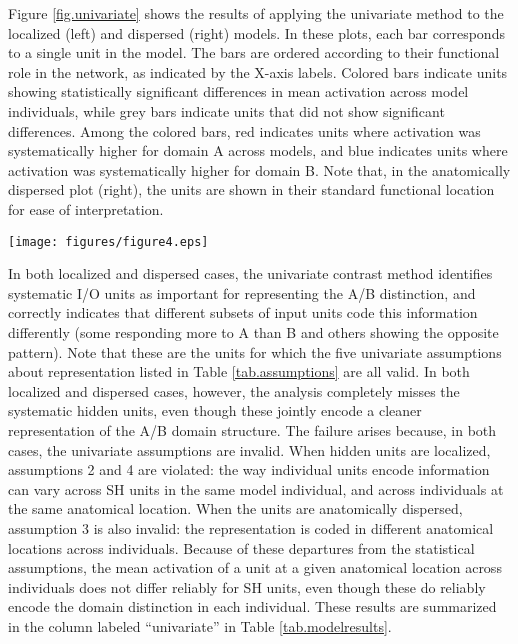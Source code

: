 Figure \ref{fig.univariate} shows the results of applying the univariate method to the localized (left) and dispersed (right) models. In these plots, each bar corresponds to a single unit in the model. The bars are ordered according to their functional role in the network, as indicated by the X-axis labels. Colored bars indicate units showing statistically significant differences in mean activation across model individuals, while grey bars indicate units that did not show significant differences. Among the colored bars, red indicates units where activation was systematically higher for domain A across models, and blue indicates units where activation was systematically higher for domain B. Note that, in the anatomically dispersed plot (right), the units are shown in their standard functional location for ease of interpretation.


\begin{figure*}
\centering
\texttt{[image: figures/figure4.eps]}
\caption{Results from the univariate analysis of simulated data. Bar height indicates the absolute value of the $t$ statistic for the unit-wise contrast between conditions at the group level. Colored bars indicate units showing significant differences with p-values corrected to control the false discovery rate at $q<0.05$. The red-blue scale indicates the direction of the contrast effect across model subjects, with red indicating units consistently showing greater activation for A items.}
\label{fig.univariate} 
\end{figure*}

In both localized and dispersed cases, the univariate contrast method identifies systematic I/O units as important for representing the A/B distinction, and correctly indicates that different subsets of input units code this information differently (some responding more to A than B and others showing the opposite pattern). Note that these are the units for which the five univariate assumptions about representation listed in Table \ref{tab.assumptions} are all valid. In both localized and dispersed cases, however, the analysis completely misses the systematic hidden units, even though these jointly encode a cleaner representation of the A/B domain structure. The failure arises because, in both cases, the univariate assumptions are invalid. When hidden units are localized, assumptions 2 and 4 are violated: the way individual units encode information can vary across SH units in the same model individual, and across individuals at the same anatomical location. When the units are anatomically dispersed, assumption 3 is also invalid: the representation is coded in different anatomical locations across individuals. Because of these departures from the statistical assumptions, the mean activation of a unit at a given anatomical location across individuals does not differ reliably for SH units, even though these do reliably encode the domain distinction in each individual. These results are summarized in the column labeled ``univariate'' in Table \ref{tab.modelresults}.

